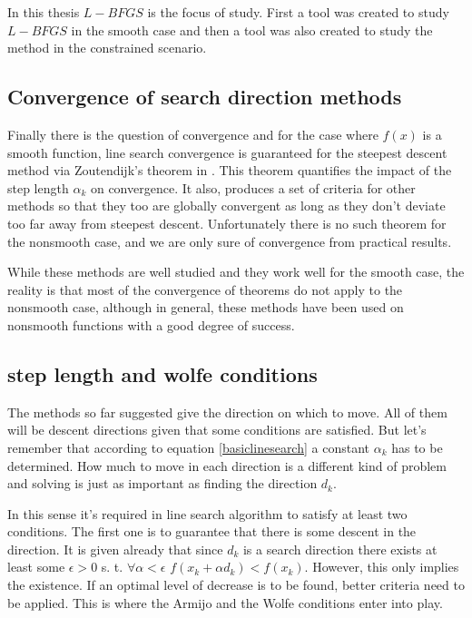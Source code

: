 In this thesis $L-BFGS$ is the focus of study.  First a tool was created to study $L-BFGS$ in the smooth case and then a tool was also created to study the method in the constrained scenario.

\subsection{Convergence of search direction methods}

Finally there is the question of convergence and for the case where $f(x)$ is a smooth function, line search convergence is guaranteed for the steepest descent method via Zoutendijk's theorem \citep{zoutendijk} in \citep{Abadie}.  This theorem quantifies the impact of the step length $\alpha_k$ on convergence.  It also, produces a set of criteria for other methods so that they too are globally convergent as long as they don't deviate too far away from steepest descent. Unfortunately there is no such theorem for the nonsmooth case, and we are only sure of convergence from practical results.

While these methods are well studied and they work well for the smooth case, the reality is that most of the convergence of theorems do not apply to the nonsmooth case, although in general, these methods have been used on nonsmooth functions with a good degree of success\citep{skaaja}.

\subsection{step length and wolfe conditions}

The methods so far suggested give the direction on which to move.  All of them will be descent directions given that some conditions are satisfied.  But let's remember that according to equation \ref{basiclinesearch} a constant $\alpha_k$ has to be determined.  How much to move in each direction is a different kind of problem and solving is just as important as finding the direction $d_k$.

In this sense it's required in line search algorithm to satisfy at least two conditions.  The first one is to guarantee that there is some descent in the direction.  It is given already that since $d_k$ is a search direction there exists at least some $\epsilon > 0$ s. t. $\forall \alpha < \epsilon$ $f(x_k + \alpha d_k) < f(x_k)$.  However, this only implies the existence.  If an optimal level of decrease is to be found, better criteria need to be applied.  This is where the Armijo and the Wolfe conditions enter into play.

